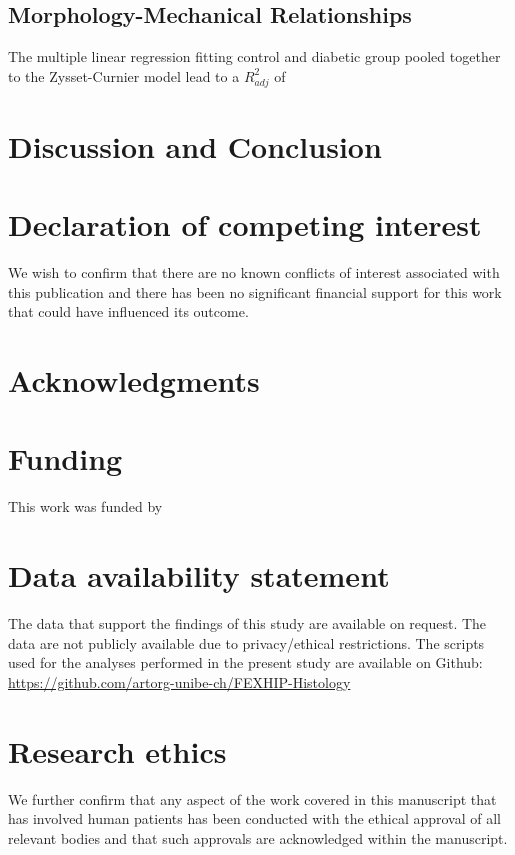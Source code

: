 \documentclass[a4paper,fleqn]{DC_ArtStyle}
\begin{document}
	\subsection{Morphology-Mechanical Relationships}
	The multiple linear regression fitting control and diabetic group pooled together to the Zysset-Curnier model lead to a $R_{adj}^{2}$ of 


	
	\section{Discussion and Conclusion}
	\lipsum[8-10]

	
	\section*{Declaration of competing interest}
	We wish to confirm that there are no known conflicts of interest associated with this publication and there has been no significant financial support for this work that could have influenced its outcome.

	\section*{Acknowledgments}
	
	\section*{Funding}
	This work was funded by

	\section*{Data availability statement}
	The data that support the findings of this study are available on request. The data are not publicly available due to privacy/ethical restrictions. The scripts used for the analyses performed in the present study are available on Github: \url{https://github.com/artorg-unibe-ch/FEXHIP-Histology}
	
	\section*{Research ethics}
	We further confirm that any aspect of the work covered in this manuscript that has involved human patients has been conducted with the ethical approval of all relevant bodies and that such approvals are acknowledged within the manuscript.
	
\end{document}
